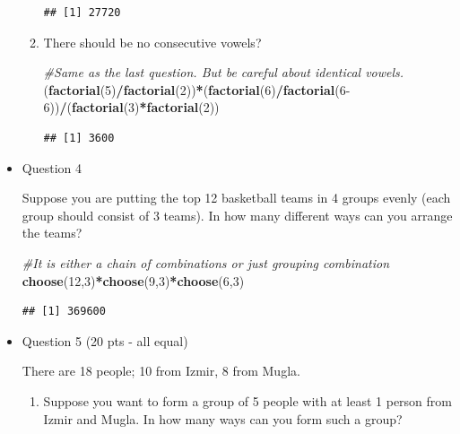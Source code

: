 \documentclass[]{book}
\newenvironment{Shaded}{\begin{snugshade}}{\end{snugshade}}
\newcommand{\CommentTok}[1]{\textcolor[rgb]{0.56,0.35,0.01}{\textit{#1}}}
\newcommand{\DecValTok}[1]{\textcolor[rgb]{0.00,0.00,0.81}{#1}}
\newcommand{\KeywordTok}[1]{\textcolor[rgb]{0.13,0.29,0.53}{\textbf{#1}}}
\newcommand{\NormalTok}[1]{#1}
\newcommand{\OperatorTok}[1]{\textcolor[rgb]{0.81,0.36,0.00}{\textbf{#1}}}
\theoremstyle{definition}
\theoremstyle{definition}
\theoremstyle{definition}
\theoremstyle{remark}
\begin{document}
\begin{itemize}
\begin{enumerate}
\begin{verbatim}
## [1] 27720
\end{verbatim}
  \item
    There should be no consecutive vowels?

\begin{Shaded}
\begin{Highlighting}[]
\CommentTok{#Same as the last question. But be careful about identical vowels.}
\NormalTok{(}\KeywordTok{factorial}\NormalTok{(}\DecValTok{5}\NormalTok{)}\OperatorTok{/}\KeywordTok{factorial}\NormalTok{(}\DecValTok{2}\NormalTok{))}\OperatorTok{*}\NormalTok{(}\KeywordTok{factorial}\NormalTok{(}\DecValTok{6}\NormalTok{)}\OperatorTok{/}\KeywordTok{factorial}\NormalTok{(}\DecValTok{6-6}\NormalTok{))}\OperatorTok{/}\NormalTok{(}\KeywordTok{factorial}\NormalTok{(}\DecValTok{3}\NormalTok{)}\OperatorTok{*}\KeywordTok{factorial}\NormalTok{(}\DecValTok{2}\NormalTok{))}
\end{Highlighting}
\end{Shaded}

\begin{verbatim}
## [1] 3600
\end{verbatim}
  \end{enumerate}
\item
  Question 4

  Suppose you are putting the top 12 basketball teams in 4 groups evenly
  (each group should consist of 3 teams). In how many different ways can
  you arrange the teams?

\begin{Shaded}
\begin{Highlighting}[]
\CommentTok{#It is either a chain of combinations or just grouping combination}
\KeywordTok{choose}\NormalTok{(}\DecValTok{12}\NormalTok{,}\DecValTok{3}\NormalTok{)}\OperatorTok{*}\KeywordTok{choose}\NormalTok{(}\DecValTok{9}\NormalTok{,}\DecValTok{3}\NormalTok{)}\OperatorTok{*}\KeywordTok{choose}\NormalTok{(}\DecValTok{6}\NormalTok{,}\DecValTok{3}\NormalTok{)}
\end{Highlighting}
\end{Shaded}

\begin{verbatim}
## [1] 369600
\end{verbatim}
\item
  Question 5 (20 pts - all equal)

  There are 18 people; 10 from Izmir, 8 from Mugla.

  \begin{enumerate}
  \def\labelenumi{\alph{enumi})}
  \item
    Suppose you want to form a group of 5 people with at least 1 person
    from Izmir and Mugla. In how many ways can you form such a group?


\end{enumerate}
\end{itemize}
\end{document}
